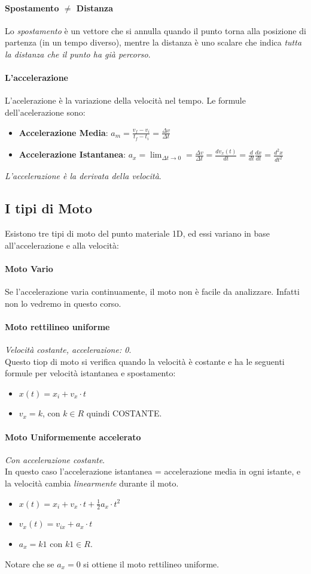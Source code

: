 \documentclass[12pt, a4paper, openany]{book}
\begin{document}
\paragraph{Spostamento $\neq$ Distanza}
Lo \emph{spostamento} è un vettore che si annulla quando il punto torna alla posizione di partenza (in un tempo diverso),
mentre la distanza è uno scalare che indica \emph{tutta la distanza che il punto ha già percorso}.
\paragraph{L'accelerazione} L'acelerazione è la variazione della velocità nel tempo.
Le formule dell'acelerazione sono:
\begin{itemize}
    \item \textbf{Accelerazione Media}: $a_m = \frac{v_f-v_i}{t_f-t_i} = \frac{\Delta v}{\Delta t}$
    \item \textbf{Accelerazione Istantanea}: $a_x = \lim_{\Delta t \to 0} = \frac{\Delta v}{\Delta t} = \frac{dv_x(t)}{dt}= \frac{d}{dt}\frac{dx}{dt} = \frac{d^2x}{dt^2}$
\end{itemize}
\emph{L'accelerazione è la derivata della velocità}.
\subsection{I tipi di Moto}
Esistono tre tipi di moto del punto materiale 1D, ed essi variano in base all'accelerazione e alla velocità:
\paragraph*{Moto Vario} Se l'accelerazione varia continuamente, il moto non è facile da analizzare. Infatti non lo vedremo in questo corso.
\paragraph*{Moto rettilineo uniforme}\emph{Velocità costante, accelerazione: 0}.
\\Questo tiop di moto si verifica quando la velocità è costante e ha le seguenti formule per velocità istantanea e spostamento:
\begin{itemize}
    \item $x(t)= x_i + v_x \cdot t$
    \item $v_x = k$, con $k\in R$ quindi COSTANTE.
\end{itemize}
\paragraph*{Moto Uniformemente accelerato} \emph{Con accelerazione costante}.
\\In questo caso l'accelerazione istantanea = accelerazione media in ogni istante, e la velocità cambia \emph{linearmente} durante il moto.
\begin{itemize}
    \item $x(t) = x_i + v_x\cdot t +\frac{1}{2} a_x \cdot t^2$
    \item $v_x(t) = v_{ix} + a_x \cdot t$
    \item $a_x = k1$ con $k1 \in R$.
\end{itemize}
Notare che se $a_x=0$ si ottiene il moto rettilineo uniforme.
\end{document}
